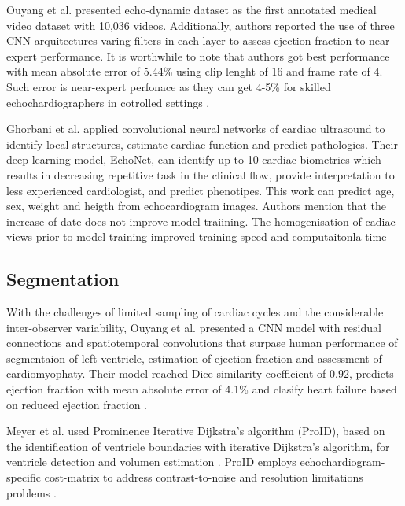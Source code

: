 Ouyang et al. presented echo-dynamic dataset as the first annotated medical video dataset with 10,036 videos. 
Additionally, authors reported the use of three CNN arquitectures varing filters in each layer to assess ejection fraction to near-expert performance.
It is worthwhile to note that authors got best performance with mean absolute error of 5.44\% using clip lenght of 16 and frame rate of 4.
Such error is near-expert perfonace as they can get 4-5\% for skilled echochardiographers in cotrolled settings \cite{ouyang-NeuripsML4H2019}.


Ghorbani et al. applied convolutional neural networks of cardiac ultrasound to identify local structures, estimate cardiac function and predict pathologies.
Their deep learning model, EchoNet, can identify up to 10 cardiac biometrics which results in decreasing repetitive task in the clinical flow, provide interpretation to less experienced cardiologist, and predict phenotipes. This work can predict age, sex, weight and heigth from echocardiogram images. 
Authors mention that the increase of date does not improve model traiining. The homogenisation of cadiac views prior to model training improved training speed and computaitonla time \cite{Ghorbani-DigitalMedicineNature-JAN2020}


\subsection{Segmentation}
With the challenges of limited sampling of cardiac cycles and the considerable inter-observer variability, Ouyang et al. presented a CNN model with residual connections and spatiotemporal convolutions that surpase human performance of segmentaion of left ventricle, estimation of ejection fraction and assessment of cardiomyophaty. 
Their model reached Dice similarity coefficient of 0.92, predicts ejection fraction with mean absolute error of 4.1\% and clasify heart failure based on reduced ejection fraction 
\cite{Ouyang-Nature-APR2020}.


Meyer et al. used Prominence Iterative Dijkstra’s algorithm (ProID), based on the identification of ventricle boundaries with iterative Dijkstra's algorithm, for ventricle detection and volumen estimation \cite{Meyers2020}.
ProID employs echochardiogram-specific cost-matrix to address contrast-to-noise and resolution limitations problems \cite{brindise2020unsupervised}.


